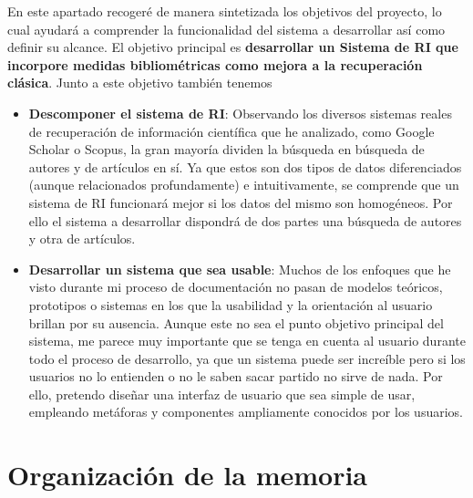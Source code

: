 En este apartado recogeré de manera sintetizada los objetivos del proyecto, lo cual ayudará a comprender la funcionalidad del sistema a desarrollar así como definir su alcance. El objetivo principal es \textbf{desarrollar un Sistema de \acrlong{RI} que incorpore medidas bibliométricas como mejora a la recuperación clásica}. Junto a este objetivo también tenemos 

\begin{itemize}

	
	\item \textbf{Descomponer el sistema de \acrshort{RI}}: Observando los diversos sistemas reales de recuperación de información científica que he analizado, como Google Scholar o Scopus, la gran mayoría dividen la búsqueda en búsqueda de autores y de artículos en sí. Ya que estos son dos tipos de datos diferenciados (aunque relacionados profundamente) e intuitivamente, se comprende que un sistema de RI funcionará mejor si los datos del mismo son homogéneos. Por ello el sistema a desarrollar dispondrá de dos partes una búsqueda de autores y otra de artículos.
	
	\item \textbf{Desarrollar un sistema que sea usable}: Muchos de los enfoques que he visto durante mi proceso de documentación no pasan de modelos teóricos, prototipos o sistemas en los que la usabilidad y la orientación al usuario brillan por su ausencia. Aunque este no sea el punto objetivo principal del sistema, me parece muy importante que se tenga en cuenta al usuario durante todo el proceso de desarrollo, ya que un sistema puede ser increíble pero si los usuarios no lo entienden o no le saben sacar partido no sirve de nada. Por ello, pretendo diseñar una interfaz de usuario que sea simple de usar, empleando metáforas y componentes ampliamente conocidos por los usuarios.

\end{itemize}


\section{Organización de la memoria}


